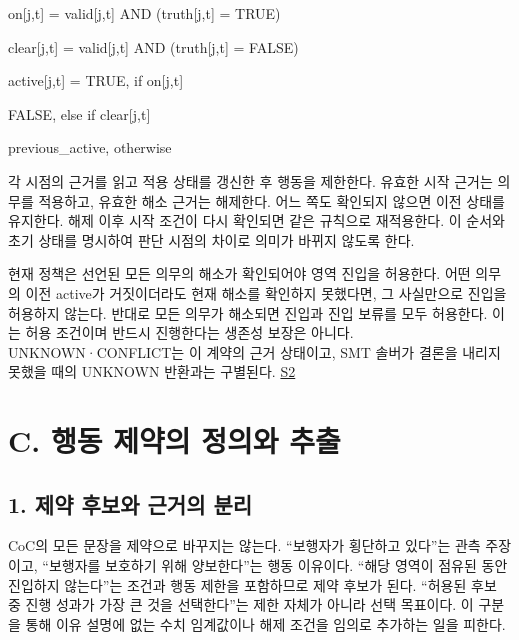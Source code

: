 \documentclass[11pt,a4paper]{article}
\begin{document}
\begingroup\small\ttfamily\setlength{\parskip}{1pt}
\noindent\hspace*{0.0em}on[j,t] = valid[j,t] AND (truth[j,t] = TRUE)\par
\noindent\hspace*{0.0em}clear[j,t] = valid[j,t] AND (truth[j,t] = FALSE)\par
\noindent\hspace*{0.0em}active[j,t] = TRUE,             if on[j,t]\par
\noindent\hspace*{7.0em}FALSE,           else if clear[j,t]\par
\noindent\hspace*{7.0em}previous\_\allowbreak{}active, otherwise\par\endgroup\par

각 시점의 근거를 읽고 적용 상태를 갱신한 후 행동을 제한한다. 유효한 시작 근거는 의무를 적용하고, 유효한 해소 근거는 해제한다. 어느 쪽도 확인되지 않으면 이전 상태를 유지한다. 해제 이후 시작 조건이 다시 확인되면 같은 규칙으로 재적용한다. 이 순서와 초기 상태를 명시하여 판단 시점의 차이로 의미가 바뀌지 않도록 한다.\par

현재 정책은 선언된 모든 의무의 해소가 확인되어야 영역 진입을 허용한다. 어떤 의무의 이전 {\ttfamily\small active}가 거짓이더라도 현재 해소를 확인하지 못했다면, 그 사실만으로 진입을 허용하지 않는다. 반대로 모든 의무가 해소되면 진입과 진입 보류를 모두 허용한다. 이는 허용 조건이며 반드시 진행한다는 생존성 보장은 아니다. UNKNOWN·CONFLICT는 이 계약의 근거 상태이고, SMT 솔버가 결론을 내리지 못했을 때의 UNKNOWN 반환과는 구별된다. \href{\detokenize{../../../../../../platforms/eblc-bcv/src/guard_synth_eblc/action_contract.py}}{S2}\par

\section*{C. 행동 제약의 정의와 추출}

\subsection*{1. 제약 후보와 근거의 분리}

CoC의 모든 문장을 제약으로 바꾸지는 않는다. “보행자가 횡단하고 있다”는 관측 주장이고, “보행자를 보호하기 위해 양보한다”는 행동 이유이다. “해당 영역이 점유된 동안 진입하지 않는다”는 조건과 행동 제한을 포함하므로 제약 후보가 된다. “허용된 후보 중 진행 성과가 가장 큰 것을 선택한다”는 제한 자체가 아니라 선택 목표이다. 이 구분을 통해 이유 설명에 없는 수치 임계값이나 해제 조건을 임의로 추가하는 일을 피한다.\par
\end{document}
